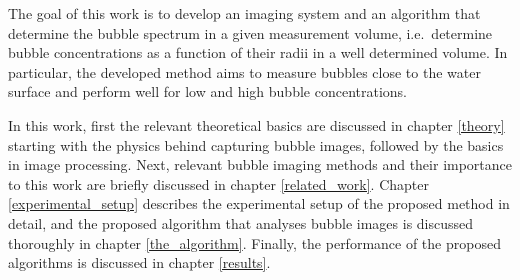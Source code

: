 	\newpage
	The goal of this work is to develop an imaging system and an algorithm that determine the bubble spectrum in a given measurement volume, i.e.\ determine bubble concentrations as a function of their radii in a well determined volume. In particular, the developed method aims to measure bubbles close to the water surface and perform well for low and high bubble concentrations.  

	In this work, first the relevant theoretical basics are discussed in chapter \ref{theory} starting with the physics behind capturing bubble images, followed by the basics in image processing. Next, relevant bubble imaging methods and their importance to this work are briefly discussed in chapter \ref{related_work}. Chapter \ref{experimental_setup} describes the experimental setup of the proposed method in detail, and the proposed algorithm that analyses bubble images is discussed thoroughly in chapter \ref{the_algorithm}. Finally, the performance of the proposed algorithms is discussed in chapter \ref{results}.